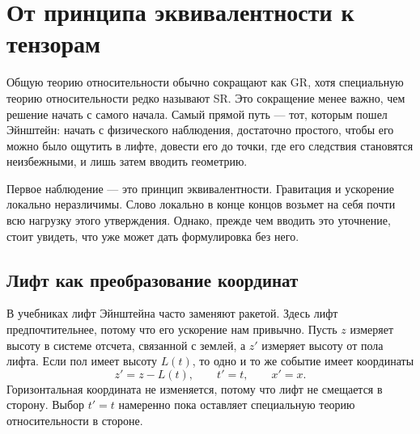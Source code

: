 \chapter{От принципа эквивалентности к тензорам}

Общую теорию относительности обычно сокращают как GR, хотя специальную теорию относительности редко называют SR. Это сокращение менее важно, чем решение начать с самого начала. Самый прямой путь — тот, которым пошел Эйнштейн: начать с физического наблюдения, достаточно простого, чтобы его можно было ощутить в лифте, довести его до точки, где его следствия становятся неизбежными, и лишь затем вводить геометрию.

Первое наблюдение — это принцип эквивалентности. Гравитация и ускорение локально неразличимы. Слово локально в конце концов возьмет на себя почти всю нагрузку этого утверждения. Однако, прежде чем вводить это уточнение, стоит увидеть, что уже может дать формулировка без него.

\section{Лифт как преобразование координат}

В учебниках лифт Эйнштейна часто заменяют ракетой. Здесь лифт предпочтительнее, потому что его ускорение нам привычно. Пусть \(z\) измеряет высоту в системе отсчета, связанной с землей, а \(z'\) измеряет высоту от пола лифта. Если пол имеет высоту \(L(t)\), то одно и то же событие имеет координаты \begin{equation}
 z'=z-L(t),\qquad t'=t,\qquad x'=x.
\label{eq:elevator-map}
\end{equation} Горизонтальная координата не изменяется, потому что лифт не смещается в сторону. Выбор \(t'=t\) намеренно пока оставляет специальную теорию относительности в стороне.

\begin{classroomqa}\end{classroomqa}

